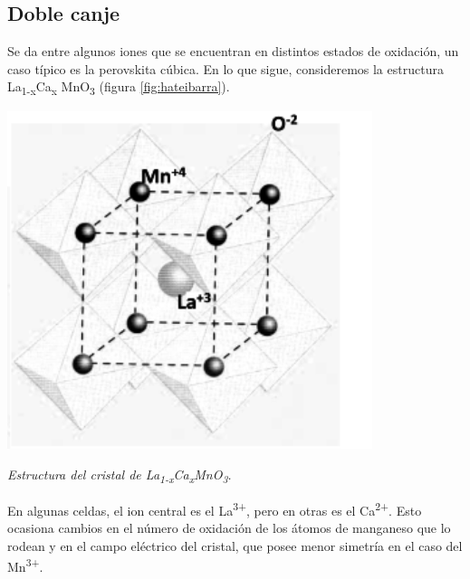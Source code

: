 \documentclass{tufte-book}
\begin{document}
\subsection{Doble canje}
Se da entre algunos iones que se encuentran en distintos estados de
oxidación, un caso típico es la perovskita cúbica. En lo que sigue,
consideremos la estructura La\textsubscript{1-x}Ca\textsubscript{x}
MnO\textsubscript{3} (figura \ref{fig:hateibarra}).

\begin{marginfigure}
  \centering
  \includegraphics[width=0.8\textwidth]{figures/lacamno.png}
  \caption{\itshape Estructura del cristal de
    La\textsubscript{1-x}Ca\textsubscript{x}MnO\textsubscript{3}.}
  \label{fig:hateibarra}
\end{marginfigure}


En algunas celdas, el ion central es el La\textsuperscript{3+}, pero
en otras es el Ca\textsuperscript{2+}. Esto ocasiona cambios en el
número de oxidación de los átomos de manganeso que lo rodean y en el
campo eléctrico del cristal, que posee menor simetría en el caso del
Mn\textsuperscript{3+}.
\end{document}
